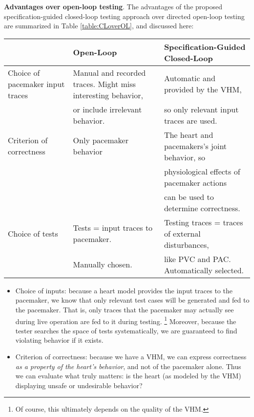 \textbf{Advantages over open-loop testing}.
The advantages of the proposed specification-guided closed-loop testing approach over directed open-loop testing are summarized in Table \ref{table:CLoverOL}, and discussed here:
\begin{table*}
	\centering
	\begin{tabular}{|l|l|l|}
	\hline                       & Open-Loop    & Specification-Guided Closed-Loop 
	\\ 
	\hline Choice of pacemaker input traces  
	                & Manual and recorded traces. Might miss interesting behavior, &  Automatic and provided by the VHM,
	\\ 
					& or include irrelevant behavior. &  so only relevant input traces are used.
	\\
	\hline Criterion of correctness    & Only pacemaker behavior & The heart and pacemakers's joint behavior, so 
	\\
	                &                  & physiological effects of pacemaker actions
	\\
	                &                  &  can be used to determine correctness.                   
	\\ 
	\hline Choice of tests & Tests = input traces to pacemaker.  & Testing traces = traces of external disturbances, 
	\\
	                & Manually chosen.  & like PVC and PAC. Automatically selected.
	\\
	\hline 
\end{tabular}
\label{table:CLoverOL}
\end{table*}

\begin{itemize}
	\item Choice of inputs: because a heart model provides the input traces to the pacemaker, we know that only relevant test cases will be generated and fed to the pacemaker. 
	That is, only traces that the pacemaker may actually see during live operation are fed to it during testing. 
	\footnote{Of course, this ultimately depends on the quality of the VHM.}
	Moreover, because the tester searches the space of tests systematically, we are guaranteed to find violating behavior if it exists.
	\item Criterion of correctness: because we have a VHM, we can express correctness \emph{as a property of the heart's behavior}, and not of the pacemaker alone. 
	Thus we can evaluate what truly matters: is the heart (as modeled by the VHM) displaying unsafe or undesirable behavior?
\end{itemize}


